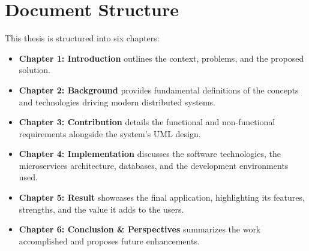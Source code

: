 \section{Document Structure}
This thesis is structured into six chapters:
\begin{itemize}
    \item \textbf{Chapter 1: Introduction} outlines the context, problems, and the proposed solution.
    \item \textbf{Chapter 2: Background} provides fundamental definitions of the concepts and technologies driving modern distributed systems.
    \item \textbf{Chapter 3: Contribution} details the functional and non-functional requirements alongside the system's UML design.
    \item \textbf{Chapter 4: Implementation} discusses the software technologies, the microservices architecture, databases, and the development environments used.
    \item \textbf{Chapter 5: Result} showcases the final application, highlighting its features, strengths, and the value it adds to the users.
    \item \textbf{Chapter 6: Conclusion \& Perspectives} summarizes the work accomplished and proposes future enhancements.
\end{itemize}
